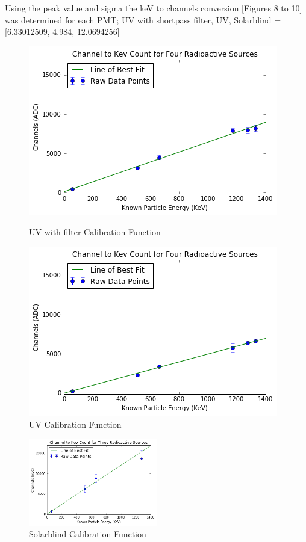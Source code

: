 \documentclass{article}
\begin{document}
\noindent
Using the peak value and sigma the keV to channels conversion [Figures 8 to 10] was determined for each PMT; UV with shortpass filter, UV, Solarblind = [6.33012509, 4.984, 12.0694256] 

\begin{figure}[H]
  \centering
  \begin{minipage}[b]{0.4\textwidth}
    \includegraphics[width=\textwidth]{chanf.png}
    \caption{UV with filter Calibration Function}
  \end{minipage}
  \hfill
  \begin{minipage}[b]{0.4\textwidth}
    \includegraphics[width=\textwidth]{chanuv.png}
    \caption{UV Calibration Function}
  \end{minipage}
\end{figure}

\begin{figure}
  \centering
    \includegraphics[width=0.5\textwidth]{chansb.png}
  \caption{Solarblind Calibration Function}
  \label{fig:workflowedge}
\end{figure} 
\end{document}
